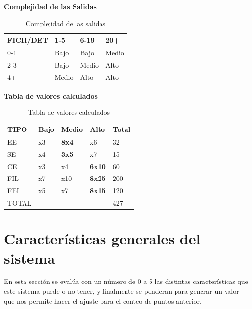 \documentclass[a4paper,12pt,openany,oneside]{book}
\begin{document}
\begin{table}[!ht]
\centering
\textbf{Complejidad de las Salidas}\\
\begin{tabular}{| l | l | l | l |}
\hline
\rowcolor{green!50}
\textbf{FICH/DET} & \textbf{1-5} & \textbf{6-19} & \textbf{20+} \\
\hline
0-1 & Bajo & Bajo & Medio\\
\hline
2-3 & Bajo & Medio & Alto\\
\hline
4+ & Medio & Alto & Alto\\
\hline
\end{tabular}
\caption{Complejidad de las salidas}
\end{table}

\begin{table}[!ht]
\centering
\textbf{Tabla de valores calculados}\\
\begin{tabular}{| l | l | l | l | l |}
\hline
\rowcolor{green!50}
\textbf{TIPO} & \textbf{Bajo} & \textbf{Medio} & \textbf{Alto} & \textbf{Total} \\
\hline
EE & x3  & \textbf{8x4}  & x6 & 32\\
\hline
SE & x4  & \textbf{3x5}  & x7 & 15\\
\hline
CE & x3  & x4  & \textbf{6x10} & 60\\
\hline
FIL & x7 & x10 & \textbf{8x25} & 200\\
\hline
FEI & x5 & x7 & \textbf{8x15} & 120\\
\hline
TOTAL &  &  & & 427\\
\hline
\end{tabular}
\caption{Tabla de valores calculados}
\end{table}

\section{Características generales del sistema}

En esta sección se evalúa con un número de 0 a 5 las distintas características que este sistema puede o no tener, y finalmente se ponderan para generar un valor que nos permite hacer el ajuste para el conteo de puntos anterior.
\end{document}
